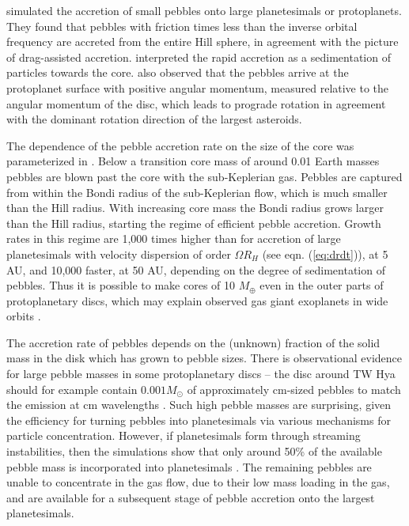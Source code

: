 \cite{Johansen2010} simulated the accretion of small pebbles onto large planetesimals or protoplanets.
They found that pebbles with friction times less than the inverse orbital frequency are accreted from the entire Hill
sphere, in agreement with the picture of drag-assisted accretion. \cite{Ormel2010} interpreted the rapid 
accretion as a sedimentation of particles towards the core. \cite{Johansen2010} also observed that the pebbles
arrive at the protoplanet surface with positive angular momentum, measured relative to the angular momentum of the
disc, which leads to prograde rotation in agreement with the dominant rotation direction of the largest asteroids.

The dependence of the pebble accretion rate on the size of the core was parameterized in \cite{Lambrechts2012}. 
Below a transition core mass of around 0.01 Earth masses pebbles are blown past the core with the 
sub-Keplerian gas. Pebbles are captured from within the Bondi radius of the sub-Keplerian flow, which is much smaller
than the Hill radius. With increasing core mass the Bondi radius grows larger than the Hill radius, starting the regime
of efficient pebble accretion. Growth rates in this regime are 1,000 times higher than for accretion of large planetesimals
with velocity dispersion of order $\Omega R_H$ (see eqn. (\ref{eq:drdt})), at 5 AU, and 10,000 faster, at 50 AU, depending on the degree
of sedimentation of pebbles. Thus it is possible to make cores of 10 $M_\oplus$ even in the outer parts of protoplanetary
discs, which may explain observed gas giant exoplanets in wide orbits \citep{Marois2008}.

The accretion rate of pebbles depends on the (unknown) fraction of the solid mass in the disk which has grown to
pebble sizes. There is observational evidence for large pebble masses in some protoplanetary discs – the disc around
TW Hya should for example contain $0.001 M_{\odot}$ of approximately cm-sized pebbles to match the emission at cm 
wavelengths \citep{Wilner2005}. Such high pebble masses are surprising, given the efficiency for turning pebbles into
planetesimals via various mechanisms for particle concentration. However, if 
planetesimals form through streaming instabilities, then the simulations show that only around 50\% of the available pebble
mass is incorporated into planetesimals \citep{Johansen2012b}. The remaining pebbles are unable to concentrate
in the gas flow, due to their low mass loading in the gas, and are available for a subsequent stage of pebble accretion
onto the largest planetesimals.

